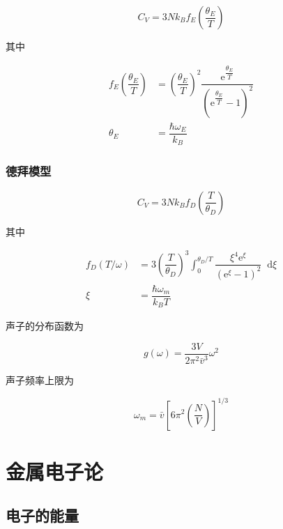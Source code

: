 \documentclass{article}
\newcommand*{\md}{\mathop{}\!\mathrm{d}}
\newcommand*{\me}{\mathrm{e}}
\begin{document}
\begin{multicols}{2}
\begin{equation*}
  C_V = 3Nk_B f_E \left( \dfrac{\theta_E}{T} \right)
\end{equation*}

其中

\begin{equation*}
  \begin{aligned}
    f_E \left( \dfrac{\theta_E}{T} \right) &= \left( \dfrac{\theta_E}{T} \right)^2 \dfrac{\me^{\dfrac{\theta_E}{T}}}{\left( \me^{\dfrac{\theta_E}{T}} -1 \right)^2} \\
    \theta_E &= \dfrac{\hbar \omega_E}{k_B}
  \end{aligned}
\end{equation*}

\subsubsection{德拜模型}

\begin{equation*}
  C_V = 3Nk_B f_D \left( \dfrac{T}{\theta_D} \right)
\end{equation*}

其中

\begin{equation*}
  \begin{aligned}
    f_D \left( T / \omega \right) &= 3 \left( \dfrac{T}{\theta_D}  \right)^3 \int_0^{\theta_D / T} \dfrac{\xi^4 \me^{\xi}}{\left( \me^{\xi} - 1 \right)^2} \md \xi \\
    \xi &= \dfrac{\hbar \omega_m}{k_B T}
  \end{aligned}
\end{equation*}

声子的分布函数为

\begin{equation*}
  g \left( \omega \right) = \dfrac{3 V}{2\pi^2 \bar{v}^3} \omega^2
\end{equation*}

声子频率上限为

\begin{equation*}
  \omega_m = \bar{v} \left[ 6\pi^2 \left( \dfrac{N}{V} \right) \right]^{1/3}
\end{equation*}

\section{金属电子论}

\subsection{电子的能量}


\end{multicols}
\end{document}
